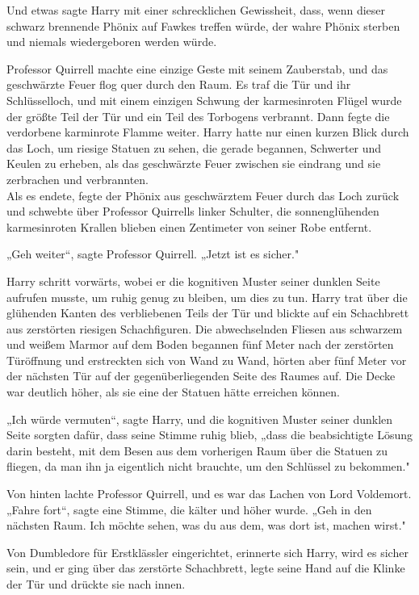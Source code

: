 {Und etwas sagte Harry mit einer schrecklichen Gewissheit, dass, wenn dieser schwarz brennende Phönix auf Fawkes treffen würde, der wahre Phönix sterben und niemals wiedergeboren werden würde.

Professor Quirrell machte eine einzige Geste mit seinem Zauberstab, und das geschwärzte Feuer flog quer durch den Raum. Es traf die Tür und ihr Schlüsselloch, und mit einem einzigen Schwung der karmesinroten Flügel wurde der größte Teil der Tür und ein Teil des Torbogens verbrannt. Dann fegte die verdorbene karminrote Flamme weiter. Harry hatte nur einen kurzen Blick durch das Loch, um riesige Statuen zu sehen, die gerade begannen, Schwerter und Keulen zu erheben, als das geschwärzte Feuer zwischen sie eindrang und sie zerbrachen und verbrannten.\\ Als es endete, fegte der Phönix aus geschwärztem Feuer durch das Loch zurück und schwebte über Professor Quirrells linker Schulter, die sonnenglühenden karmesinroten Krallen blieben einen Zentimeter von seiner Robe entfernt.

„Geh weiter“, sagte Professor Quirrell. „Jetzt ist es sicher."

Harry schritt vorwärts, wobei er die kognitiven Muster seiner dunklen Seite aufrufen musste, um ruhig genug zu bleiben, um dies zu tun. Harry trat über die glühenden Kanten des verbliebenen Teils der Tür und blickte auf ein Schachbrett aus zerstörten riesigen Schachfiguren. Die abwechselnden Fliesen aus schwarzem und weißem Marmor auf dem Boden begannen fünf Meter nach der zerstörten Türöffnung und erstreckten sich von Wand zu Wand, hörten aber fünf Meter vor der nächsten Tür auf der gegenüberliegenden Seite des Raumes auf. Die Decke war deutlich höher, als sie eine der Statuen hätte erreichen können.

„Ich würde vermuten“, sagte Harry, und die kognitiven Muster seiner dunklen Seite sorgten dafür, dass seine Stimme ruhig blieb, „dass die beabsichtigte Lösung darin besteht, mit dem Besen aus dem vorherigen Raum über die Statuen zu fliegen, da man ihn ja eigentlich nicht brauchte, um den Schlüssel zu bekommen."

Von hinten lachte Professor Quirrell, und es war das Lachen von Lord Voldemort.\\ „Fahre fort“, sagte eine Stimme, die kälter und höher wurde. „Geh in den nächsten Raum. Ich möchte sehen, was du aus dem, was dort ist, machen wirst."

Von Dumbledore für Erstklässler eingerichtet, erinnerte sich Harry, wird es sicher sein, und er ging über das zerstörte Schachbrett, legte seine Hand auf die Klinke der Tür und drückte sie nach innen.

}
